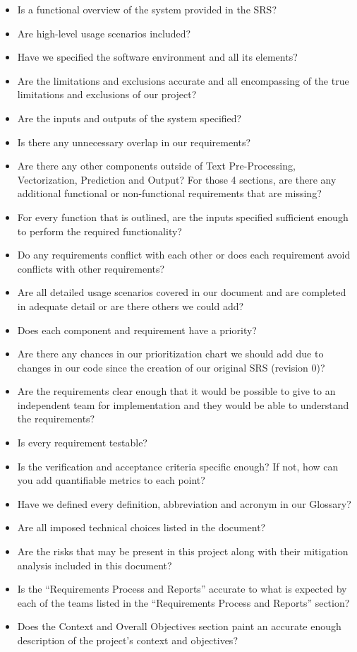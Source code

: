 \documentclass[12pt, titlepage]{article}
\begin{document}
  \begin{itemize}
  \item Is a functional overview of the system provided in the SRS?
  \item Are high-level usage scenarios included?
  \item Have we specified the software environment and all its elements?
  \item Are the limitations and exclusions accurate and all encompassing of the true limitations and exclusions of our project?
  \item Are the inputs and outputs of the system specified?
  \item Is there any unnecessary overlap in our requirements?
  \item Are there any other components outside of Text Pre-Processing, Vectorization, Prediction and Output? For those 4 sections, are there any additional functional or non-functional requirements that are missing?
  \item For every function that is outlined, are the inputs specified sufficient enough to perform the required functionality?
  \item Do any requirements conflict with each other or does each requirement avoid conflicts with other requirements?
  \item Are all detailed usage scenarios covered in our document and are completed in adequate detail or are there others we could add?
  \item Does each component and requirement have a priority?
  \item Are there any chances in our prioritization chart we should add due to changes in our code since the creation of our original SRS (revision 0)?
  \item Are the requirements clear enough that it would be possible to give to an independent team for implementation and they would be able to understand the requirements?
  \item Is every requirement testable?
  \item Is the verification and acceptance criteria specific enough? If not, how can you add quantifiable metrics to each point?
  \item Have we defined every definition, abbreviation and acronym in our Glossary?
  \item Are all imposed technical choices listed in the document?
  \item Are the risks that may be present in this project along with their mitigation analysis included in this document?
  \item Is the “Requirements Process and Reports” accurate to what is expected by each of the teams listed in the “Requirements Process and Reports” section?
  \item Does the Context and Overall Objectives section paint an accurate enough description of the project's context and objectives?\\
  \end{itemize}
  
\end{document}

